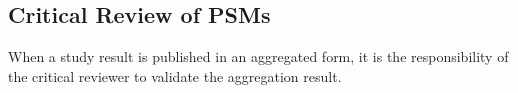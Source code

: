 \subsection{Critical Review of PSMs}

When a study result is published in an aggregated form, it is the responsibility of the critical reviewer to validate the aggregation result. 


